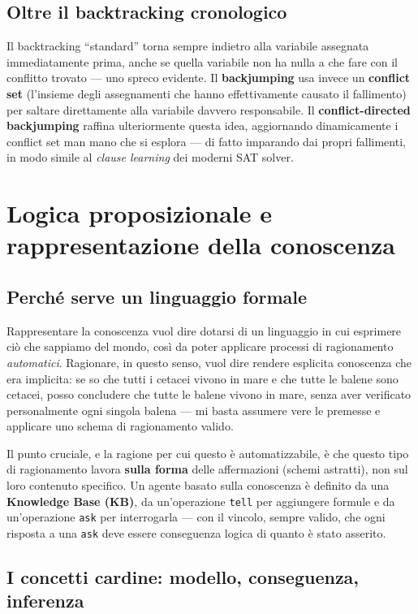 \documentclass[11pt,a4paper]{article}
\begin{document}
\subsection{Oltre il backtracking cronologico}

Il backtracking ``standard'' torna sempre indietro alla variabile assegnata immediatamente prima, anche se quella variabile non ha nulla a che fare con il conflitto trovato --- uno spreco evidente. Il \textbf{backjumping} usa invece un \textbf{conflict set} (l'insieme degli assegnamenti che hanno effettivamente causato il fallimento) per saltare direttamente alla variabile davvero responsabile. Il \textbf{conflict-directed backjumping} raffina ulteriormente questa idea, aggiornando dinamicamente i conflict set man mano che si esplora --- di fatto imparando dai propri fallimenti, in modo simile al \emph{clause learning} dei moderni SAT solver.

\newpage
\section{Logica proposizionale e rappresentazione della conoscenza}

\subsection{Perché serve un linguaggio formale}

Rappresentare la conoscenza vuol dire dotarsi di un linguaggio in cui esprimere ciò che sappiamo del mondo, così da poter applicare processi di ragionamento \emph{automatici}. Ragionare, in questo senso, vuol dire rendere esplicita conoscenza che era implicita: se so che tutti i cetacei vivono in mare e che tutte le balene sono cetacei, posso concludere che tutte le balene vivono in mare, senza aver verificato personalmente ogni singola balena --- mi basta assumere vere le premesse e applicare uno schema di ragionamento valido.

Il punto cruciale, e la ragione per cui questo è automatizzabile, è che questo tipo di ragionamento lavora \textbf{sulla forma} delle affermazioni (schemi astratti), non sul loro contenuto specifico. Un agente basato sulla conoscenza è definito da una \textbf{Knowledge Base (KB)}, da un'operazione \texttt{tell} per aggiungere formule e da un'operazione \texttt{ask} per interrogarla --- con il vincolo, sempre valido, che ogni risposta a una \texttt{ask} deve essere conseguenza logica di quanto è stato asserito.

\subsection{I concetti cardine: modello, conseguenza, inferenza}
\end{document}
